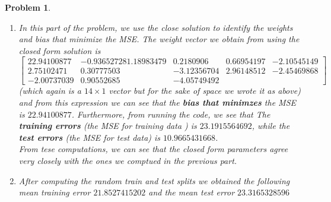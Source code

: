 \documentclass[12pt]{article}
\newtheorem{problem}{Problem}%
\begin{document}
\begin{problem}
\begin{enumerate}
\item In this part of the problem, we use the close solution to identify the weights and bias that minimize the MSE. The weight vector we obtain from using the closed form solution is \[\left[ \begin{matrix} 22.94100877 & -0.93652728   1.18983479 &  0.2180906 &   0.66954197&
  -2.10545149  \\ 2.75102471  & 0.30777503 & -3.12356704  & 2.96148512 &
  -2.45469868 \\ -2.00737039 &  0.90552685 & -4.05749492\end{matrix}\right] \] (which again is a $14 \times 1$ vector but for the sake of space we wrote it as above) and from this expression we can see that the \textbf{bias that minimzes} the MSE is $22.94100877$. Furthermore, from running the code, we see that The \textbf{training errors} (the MSE for training data ) is $23.1915564692$, while the \textbf{test errors} (the MSE for test data) is $10.9665431668$.\\ From tese computations, we can see that the closed form parameters agree very closely with the ones we comptued in the previous part. 

\item After computing the random train and test splits we obtained the following mean training error $21.8527415202$ and the mean test error $23.3165328596$

\end{enumerate}
\end{problem}
\end{document}
